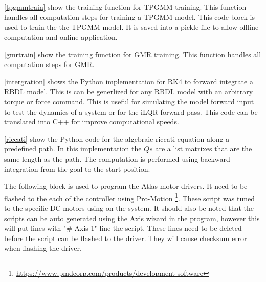 \chapter{}

\autoref{tpgmmtrain} show the training function for TPGMM training. This function handles all computation steps for training a TPGMM model. This code block is used to train the the TPGMM model. It is saved into a pickle file to allow offline computation and online application.



\autoref{gmrtrain} show the training function for GMR training. This function handles all computation steps for GMR. 



\autoref{intergration} shows the Python implementation for RK4 to forward integrate a RBDL model. This is can be generlized for any RBDL model with an arbitrary torque or force command. This is useful for simulating the model forward input to test the dynamics of a system or for the iLQR forward pass. This code can be translated into C++ for improve computational speeds. 



\autoref{riccati} show the Python code for the algebraic riccati equation along a predefined path. In this implementation the $Qs$ are a list matrixes that are the same length as the path. The computation is performed using backward integration from the goal to the start position.  




The following block is used to program the Atlas motor drivers. It need to be flashed to the each of the controller using Pro-Motion \footnote{\href{https://www.pmdcorp.com/products/development-software}{https://www.pmdcorp.com/products/development-software}}. These script was tuned to the specific DC motors using on the system. It should also be noted that the scripts can be auto generated using the Axis wizard in the program, however this will put lines with "\# Axis 1" line the script. These lines need to be deleted before the script can be flashed to the driver. They will cause checksum error when flashing the driver.   

